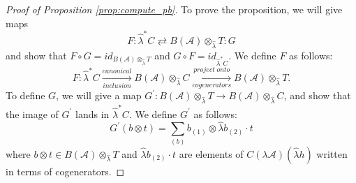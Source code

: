 \begin{proof}[Proof of Proposition \ref{prop:compute_pb}]
%
To prove the proposition, 
we will give maps
$$
F: \hat{\lambda}^*C \rightleftarrows B(\mathcal{A}) \otimes_{\hat{\lambda}} T:G
$$
and show that $F\circ G = id_{B(\mathcal{A}) \otimes_{\hat{\lambda}} T}$ 
and $G \circ F = id_{\hat{\lambda}^*C}$.
We define $F$ as follows: 
$$
F:\hat{\lambda}^*C 
\xrightarrow[inclusion]{canonical}
B(\mathcal{A}) \otimes_{\hat{\lambda}} C
\xrightarrow[cogenerators]{project\;onto}
B(\mathcal{A}) \otimes_{\hat{\lambda}} T.
$$
To define $G$, we will give a map 
$G^\prime: B(\mathcal{A}) \otimes_{\hat{\lambda}} T \to 
B(\mathcal{A}) \otimes_{\hat{\lambda}} C$, and show that the image of 
$G^\prime$ lands in $\hat{\lambda}^*C$. We define 
$G^\prime$ as follows:
$$
G^\prime(b \otimes t) = 
\sum \limits_{(b)} b_{(1)} \otimes \hat{\lambda} b_{(2)} \cdot t
$$
where $b \otimes t \in B(\mathcal{A}) \otimes_{\hat{\lambda}} T$ and $\hat{\lambda} 
b_{(2)} \cdot t$ are elements of $C(\lambda \mathcal{A})(\hat{\lambda} h)$ 
written in terms of cogenerators.


\end{proof}
